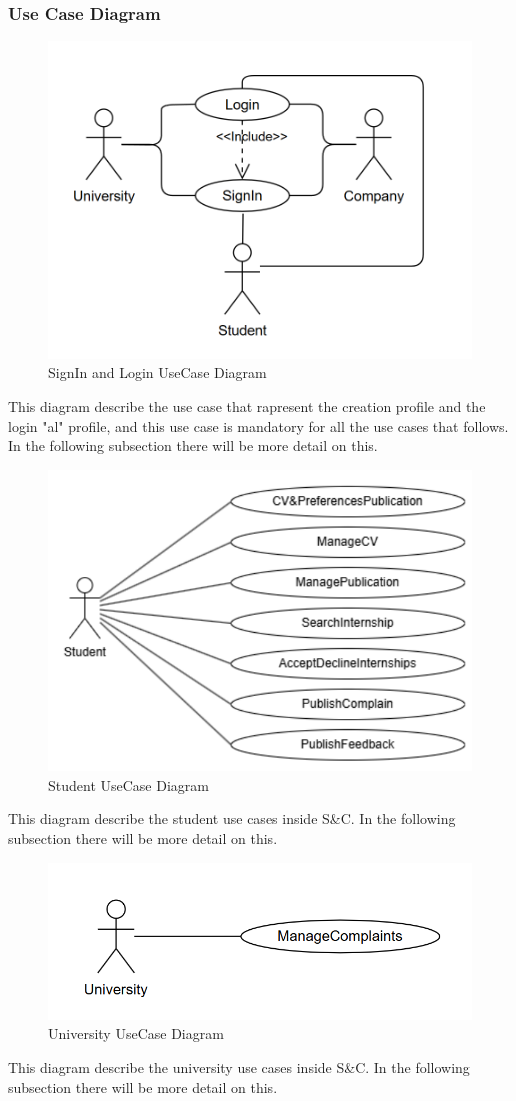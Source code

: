 \documentclass{article}
\begin{document}
\subsubsection{Use Case Diagram}

\begin{figure}[H]
    \centering
    \includegraphics[width=0.5\linewidth]{Login-Signin.png}
    \caption{SignIn and Login UseCase Diagram}
    \label{fig:enter-label}
\end{figure}
This diagram describe the use case that rapresent the creation profile and the login "al" profile, and this use case is mandatory for all the use cases that follows. In the following subsection there will be more detail on this.

\begin{figure}[H]
    \centering
    \includegraphics[width=0.5\linewidth]{usecasesStudent.png}
    \caption{Student UseCase Diagram}
    \label{fig:enter-label}
\end{figure}
This diagram describe the student use cases inside S\&C. In the following subsection there will be more detail on this.

\begin{figure}[H]
    \centering
    \includegraphics[width=0.5\linewidth]{UniversityUseCases.png}
    \caption{University UseCase Diagram}
    \label{fig:enter-label}
\end{figure}
This diagram describe the university use cases inside S\&C. In the following subsection there will be more detail on this.
\end{document}
